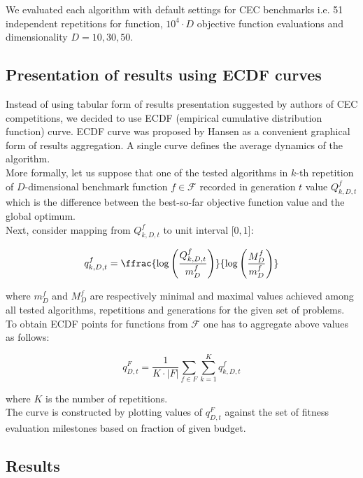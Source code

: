 We evaluated each algorithm with default settings for CEC benchmarks i.e. 51 independent repetitions for function, $10^{4}\cdot D$ objective function evaluations and dimensionality $D = 10, 30, 50$.

\subsection{Presentation of results using ECDF curves}

Instead of using tabular form of results presentation suggested by authors of CEC competitions, we decided to use ECDF (empirical cumulative distribution function) curve.
ECDF curve was proposed by Hansen \cite{Hansen-ecdf} as a convenient graphical form of results aggregation. A single curve defines the average dynamics of the algorithm.
\\
More formally, let us suppose that one of the tested algorithms in $k$-th repetition of $D$-dimensional benchmark function $f \in \mathcal{F}$ recorded in generation $t$ value $Q^{f}_{k, D, t}$ 
which is the difference between the best-so-far objective function value and the global optimum. \\
Next, consider mapping from $Q^{f}_{k, D, t}$ to unit interval $[0, 1$]:

\begin{equation}
  q^{f}_{k, D, t} = \ffrac{\log\left(\frac{Q^{f}_{k, D, t}}{m^{f}_{D}}\right)}{\log\left(\frac{M^{f}_{D}}{m^{f}_{D}}\right)}
\end{equation}

where $m^{f}_{D}$ and $M^{f}_{D}$ are respectively minimal and maximal values achieved among all tested algorithms, repetitions and generations for the given set of problems. \\

To obtain ECDF points for functions from $\mathcal{F}$ one has to aggregate above values as follows:

\begin{equation}
  q^{F}_{D, t} = \frac{1}{K \cdot |F|}\sum_{f \in F} \sum^{K}_{k = 1} q^{f}_{k, D, t}  
\end{equation}

where $K$ is the number of repetitions.\\
The curve is constructed by plotting values of $q^{F}_{D, t}$ against the set of fitness evaluation milestones based on fraction of given budget. 


\subsection{Results}

